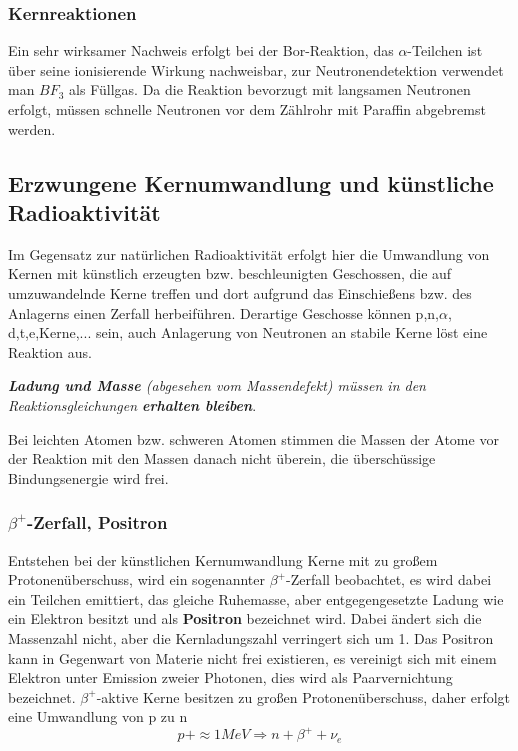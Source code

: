 \documentclass[12pt,a4paper,ngerman]{article}
\begin{document}
\subsubsection*{Kernreaktionen}
Ein sehr wirksamer Nachweis erfolgt bei der Bor-Reaktion, das $\alpha$-Teilchen ist über seine ionisierende Wirkung nachweisbar, zur Neutronendetektion verwendet man $BF_3$ als Füllgas. Da die Reaktion bevorzugt mit langsamen Neutronen erfolgt, müssen schnelle Neutronen vor dem Zählrohr mit Paraffin abgebremst werden. 


\subsection{Erzwungene Kernumwandlung und künstliche Radioaktivität}
Im Gegensatz zur natürlichen Radioaktivität erfolgt hier die Umwandlung von Kernen mit künstlich erzeugten bzw. beschleunigten Geschossen, die auf umzuwandelnde Kerne treffen und dort aufgrund das Einschießens bzw. des Anlagerns einen Zerfall herbeiführen. Derartige Geschosse können p,n,$\alpha$, d,t,e,Kerne,... sein, auch Anlagerung von Neutronen an stabile Kerne löst eine Reaktion aus. \\

\begin{center}
\textit{\textbf{Ladung und Masse} (abgesehen vom Massendefekt) müssen in den Reaktionsgleichungen \textbf{erhalten bleiben}}.
\end{center}

Bei leichten Atomen bzw. schweren Atomen stimmen die Massen der Atome vor der Reaktion mit den Massen danach nicht überein, die überschüssige Bindungsenergie wird frei. 
\subsubsection*{$\beta^+$-Zerfall, Positron}
Entstehen bei der künstlichen Kernumwandlung Kerne mit zu großem Protonenüberschuss, wird ein sogenannter $\beta^+$-Zerfall beobachtet, es wird dabei ein Teilchen emittiert, das gleiche Ruhemasse, aber entgegengesetzte Ladung wie ein Elektron besitzt und als \textbf{Positron} bezeichnet wird. Dabei ändert sich die Massenzahl nicht, aber die Kernladungszahl verringert sich um 1. Das Positron kann in Gegenwart von Materie nicht frei existieren, es vereinigt sich mit einem Elektron unter Emission zweier Photonen, dies wird als Paarvernichtung bezeichnet. 
$\beta^+$-aktive Kerne besitzen zu großen Protonenüberschuss, daher erfolgt eine Umwandlung von p zu n
\begin{equation}
p + \approx 1 MeV \Rightarrow n + \beta^+ + \nu_e
\end{equation}
\end{document}
